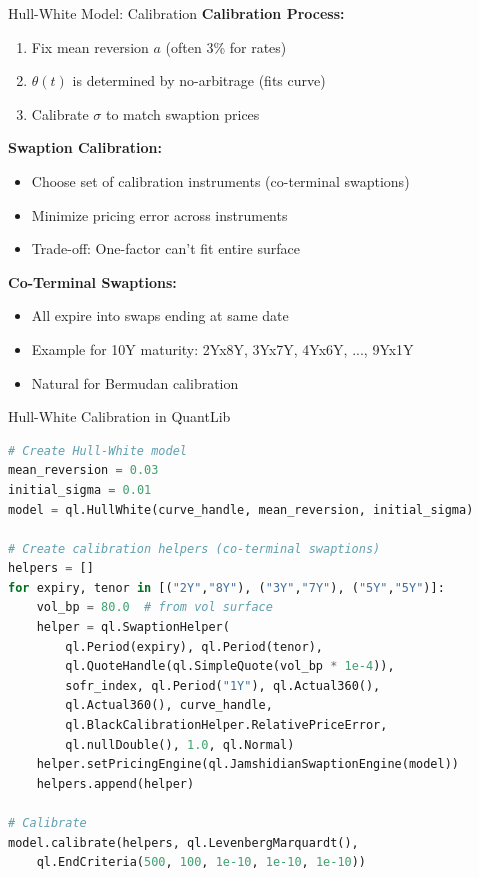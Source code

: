\documentclass[aspectratio=169,11pt]{beamer}
\begin{document}
\begin{frame}{Hull-White Model: Calibration}
\textbf{Calibration Process:}
\begin{enumerate}
    \item Fix mean reversion $a$ (often 3\% for rates)
    \item $\theta(t)$ is determined by no-arbitrage (fits curve)
    \item Calibrate $\sigma$ to match swaption prices
\end{enumerate}

\textbf{Swaption Calibration:}
\begin{itemize}
    \item Choose set of calibration instruments (co-terminal swaptions)
    \item Minimize pricing error across instruments
    \item Trade-off: One-factor can't fit entire surface
\end{itemize}

\textbf{Co-Terminal Swaptions:}
\begin{itemize}
    \item All expire into swaps ending at same date
    \item Example for 10Y maturity: 2Yx8Y, 3Yx7Y, 4Yx6Y, ..., 9Yx1Y
    \item Natural for Bermudan calibration
\end{itemize}
\end{frame}

\begin{frame}[fragile]{Hull-White Calibration in QuantLib}
\begin{lstlisting}[language=Python]
# Create Hull-White model
mean_reversion = 0.03
initial_sigma = 0.01
model = ql.HullWhite(curve_handle, mean_reversion, initial_sigma)

# Create calibration helpers (co-terminal swaptions)
helpers = []
for expiry, tenor in [("2Y","8Y"), ("3Y","7Y"), ("5Y","5Y")]:
    vol_bp = 80.0  # from vol surface
    helper = ql.SwaptionHelper(
        ql.Period(expiry), ql.Period(tenor),
        ql.QuoteHandle(ql.SimpleQuote(vol_bp * 1e-4)),
        sofr_index, ql.Period("1Y"), ql.Actual360(),
        ql.Actual360(), curve_handle,
        ql.BlackCalibrationHelper.RelativePriceError,
        ql.nullDouble(), 1.0, ql.Normal)
    helper.setPricingEngine(ql.JamshidianSwaptionEngine(model))
    helpers.append(helper)

# Calibrate
model.calibrate(helpers, ql.LevenbergMarquardt(),
    ql.EndCriteria(500, 100, 1e-10, 1e-10, 1e-10))
\end{lstlisting}
\end{frame}
\end{document}
